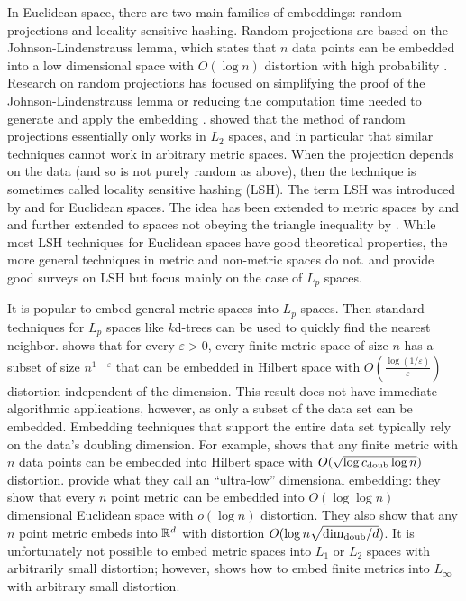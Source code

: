 \documentclass[../main.tex]{subfiles}
\newcommand{\doubdim}{\text{dim}_\textnormal{doub}}
\newcommand{\cdoub}{c_\textnormal{doub}}
\begin{document}
In Euclidean space, there are two main families of embeddings:
random projections and locality sensitive hashing.
Random projections are based on the Johnson-Lindenstrauss lemma,
which states that $n$ data points can be embedded into a low dimensional space with $O(\log n)$ distortion with high probability \citep{johnson1984extensions}.
Research on random projections has focused on simplifying the proof of the Johnson-Lindenstrauss lemma \citep{dasgupta2003elementary,baraniuk2008simple} or reducing the computation time needed to generate and apply the embedding \citep{achlioptas2001database}.
\cite{johnson2009johnson} showed that the method of random projections essentially only works in $L_2$ spaces, 
and in particular that similar techniques cannot work in arbitrary metric spaces.
When the projection depends on the data (and so is not purely random as above), 
then the technique is sometimes called locality sensitive hashing (LSH).
The term LSH was introduced by \citet{indyk1998approximate} and \citet{gionis1999similarity} for Euclidean spaces. 
The idea has been extended to metric spaces by \citet{tellez2010locality} and \citet{novak2010locality} and further extended to spaces not obeying the triangle inequality by \cite{mu2010non}.
While most LSH techniques for Euclidean spaces have good theoretical properties,
the more general techniques in metric and non-metric spaces do not.
\cite{wang2014hashing} and \cite{wang2016learning} provide good surveys on LSH but focus mainly on the case of $L_p$ spaces.

It is popular to embed general metric spaces into $L_p$ spaces.
Then standard techniques for $L_p$ spaces like $k$d-trees can be used to quickly find the nearest neighbor.
\cite{bartal2003metric} shows that for every $\varepsilon>0$,
every finite metric space of size $n$ has a subset of size $n^{1-\varepsilon}$ that can be embedded in Hilbert space with $O\left(\frac{\log(1/\varepsilon)}{\varepsilon}\right)$ distortion independent of the dimension.
This result does not have immediate algorithmic applications, however, 
as only a subset of the data set can be embedded.
Embedding techniques that support the entire data set typically rely on the data's doubling dimension.
For example, \cite{krauthgamer2004measured} shows that any finite metric with $n$ data points can be embedded into Hilbert space with $O(\sqrt{\log\cdoub\log n})$ distortion.
\cite{chan2010ultra} provide what they call an ``ultra-low'' dimensional embedding:
they show that every $n$ point metric can be embedded into $O(\log\log n)$ dimensional Euclidean space with $o(\log n)$ distortion.
They also show that any $n$ point metric embeds into $\mathbb R^d$ with distortion $O(\log n\sqrt{\doubdim/d})$.
It is unfortunately not possible to embed metric spaces into $L_1$ or $L_2$ spaces with arbitrarily small distortion;
however, \cite{neiman2016low} shows how to embed finite metrics into $L_\infty$ with arbitrary small distortion.
\end{document}
